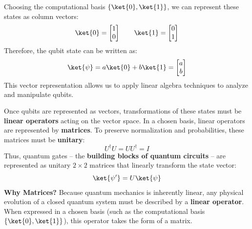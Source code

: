 \highspace
Choosing the computational basis $\{\ket{0}, \ket{1}\}$, we can represent these states as column vectors:
\begin{equation*}
    \ket{0} = \begin{bmatrix}
        1 \\ 0
    \end{bmatrix}
    \qquad
    \ket{1} = \begin{bmatrix}
        0 \\ 1
    \end{bmatrix}
\end{equation*}
Therefore, the qubit state can be written as:
\begin{equation*}
    \ket{\psi} = a\ket{0} + b\ket{1} = \begin{bmatrix}
        a \\ b
    \end{bmatrix}
\end{equation*}
This vector representation allows us to apply linear algebra techniques to analyze and manipulate qubits.

\highspace
Once qubits are represented as vectors, transformations of these states must be \textbf{linear operators} acting on the vector space. In a chosen basis, linear operators are represented by \textbf{matrices}. To preserve normalization and probabilities, these matrices must be \textbf{unitary}:
\begin{equation*}
    U^{\dagger} U = U U^{\dagger} = I
\end{equation*}
Thus, quantum gates -- the \textbf{building blocks of quantum circuits} -- are represented as unitary $2 \times 2$ matrices that linearly transform the state vector:
\begin{equation*}
    \ket{\psi'} = U\ket{\psi}
\end{equation*}
\textcolor{Green3}{ \textbf{Why Matrices?}} Because quantum mechanics is inherently linear, any physical evolution of a closed quantum system must be described by a \textbf{linear operator}. When expressed in a chosen basis (such as the computational basis $\{\ket{0}, \ket{1}\}$), this operator takes the form of a matrix.

